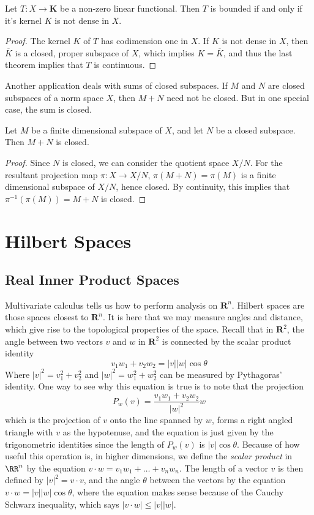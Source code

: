 \begin{theorem}
    Let $T: X \to \mathbf{K}$ be a non-zero linear functional. Then $T$ is bounded if and only if it's kernel $K$ is not dense in $X$.
\end{theorem}
\begin{proof}
    The kernel $K$ of $T$ has codimension one in $X$. If $K$ is not dense in $X$, then $\overline{K}$ is a closed, proper subspace of $X$, which implies $K = \overline{K}$, and thus the last theorem implies that $T$ is continuous.
\end{proof}

Another application deals with sums of closed subspaces. If $M$ and $N$ are closed subspaces of a norm space $X$, then $M + N$ need not be closed. But in one special case, the sum is closed.

\begin{theorem}
    Let $M$ be a finite dimensional subspace of $X$, and let $N$ be a closed subspace. Then $M + N$ is closed.
\end{theorem}
\begin{proof}
    Since $N$ is closed, we can consider the quotient space $X/N$. For the resultant projection map $\pi: X \to X/N$, $\pi(M + N) = \pi(M)$ is a finite dimensional subspace of $X/N$, hence closed. By continuity, this implies that $\pi^{-1}(\pi(M)) = M + N$ is closed.
\end{proof}

\chapter{Hilbert Spaces}

\section{Real Inner Product Spaces}

Multivariate calculus tells us how to perform analysis on $\mathbf{R}^n$. Hilbert spaces are those spaces closest to $\mathbf{R}^n$. It is here that we may measure angles and distance, which give rise to the topological properties of the space. Recall that in $\mathbf{R}^2$, the angle between two vectors $v$ and $w$ in $\mathbf{R}^2$ is connected by the scalar product identity
%
\[ v_1w_1 + v_2w_2 = |v||w| \cos \theta \]
%
Where $|v|^2 = v_1^2 + v_2^2$ and $|w|^2 = w_1^2 + w_2^2$ can be measured by Pythagoras' identity. One way to see why this equation is true is to note that the projection
%
\[ P_w(v) = \frac{v_1w_1 + v_2w_2}{|w|^2} w \]
%
which is the projection of $v$ onto the line spanned by $w$, forms a right angled triangle with $v$ as the hypotenuse, and the equation is just given by the trigonometric identities since the length of $P_w(v)$ is $|v| \cos \theta$. Because of how useful this operation is, in higher dimensions, we define the {\it scalar product} in $\RR^n$ by the equation $v \cdot w = v_1w_1 + \dots + v_nw_n$. The length of a vector $v$ is then defined by $|v|^2 = v \cdot v$, and the angle $\theta$ between the vectors by the equation $v \cdot w = |v| |w| \cos \theta$, where the equation makes sense because of the Cauchy Schwarz inequality, which says $|v \cdot w| \leq |v||w|$.

